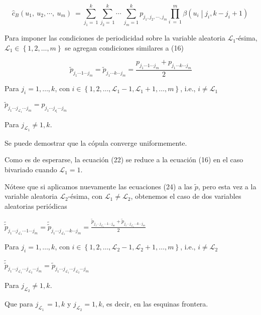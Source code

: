 $${\hat{c}}_{B}\left( u_{1},\ u_{2},\cdots,\ u_{m} \right)\  = \sum_{j_{1} = \ 1}^{k}{\sum_{j_{2} = \ 1}^{k}\cdots\ \sum_{j_{m} = 1}^{k}p_{j_{1},j_{2},\cdots,j_{m}}\prod_{i\  = \ 1}^{m}{\beta\left( u_{i} \middle| j_{i},k - j_{i} + 1 \right)\ }}$$

Para imponer las condiciones de periodicidad sobre la variable aleatoria \(\mathcal{L}_{1}\)-\'esima, \(\mathcal{L}_{1} \in \left\{ 1,2,\ldots,m \right\}\) se agregan condiciones similares a (16)

$${\tilde{p}}_{j_{1}\cdots 1\cdots j_{m}} = {\tilde{p}}_{j_{1}\cdots k\cdots j_{m}} = \frac{p_{j_{1}\cdots 1\cdots j_{m}} + p_{j_{1}\cdots k\cdots j_{m}}}{2}$$

Para \(j_{i} = 1,\ldots,k\), con
\(i \in \left\{ 1,2,\ldots,\mathcal{L}_{1} - 1,\mathcal{L}_{1} + 1,\ldots,m \right\}\),
i.e., \(i \neq \mathcal{L}_{1}\)

\({\tilde{p}}_{j_{1}\cdots j_{\mathcal{L}_{1}}\cdots j_{m}} = p_{j_{1}\cdots j_{\mathcal{l}_{1}}\cdots j_{m}}\)

Para \(j_{\mathcal{L}_{1}} \neq 1,k\).

Se puede demostrar que la c\'opula converge uniformemente.

Como es de esperarse, la ecuaci\'on (22) se reduce a la ecuaci\'on (16) en el caso bivariado cuando \(\mathcal{L}_{1} = 1\).

N\'otese que si aplicamos nuevamente las ecuaciones (24) a las \(\tilde{p}\), pero esta vez a la variable aleatoria \(\mathcal{L}_{2}\)-\'esima, con \(\mathcal{L}_{1} \neq \mathcal{L}_{2}\), obtenemos el caso de dos variables aleatorias peri\'odicas

\({\tilde{\tilde{p}}}_{j_{1}\cdots j_{\mathcal{L}_{1}}\cdots 1\cdots j_{m}} = {\tilde{\tilde{p}}}_{j_{1}\cdots j_{\mathcal{L}_{1}}\cdots k\cdots j_{m}} = \frac{{\tilde{p}}_{j_{1}\cdots j_{\mathcal{L}_{1}}\cdots 1\cdots j_{m}} + {\tilde{p}}_{j_{1}\cdots j_{\mathcal{L}_{1}}\cdots k\cdots j_{m}}}{2}\)

Para \(j_{i} = 1,\ldots,k\), con
\(i \in \left\{ 1,2,\ldots,\mathcal{L}_{2} - 1,\mathcal{L}_{2} + 1,\ldots,m \right\}\),
i.e., \(i \neq \mathcal{L}_{2}\)

\({\tilde{\tilde{p}}}_{j_{1}\cdots j_{\mathcal{L}_{1}}\cdots j_{\mathcal{L}_{2}}\cdots j_{m}} = {\tilde{p}}_{j_{1}\cdots j_{\mathcal{L}_{1}}\cdots j_{\mathcal{L}_{2}}\cdots j_{m}}\)

Para \(j_{\mathcal{L}_{2}} \neq 1,k\). 

Que para \(j_{\mathcal{L}_{1\ }} = 1,k\) y \(j_{\mathcal{L}_{2}} = 1,k\), es decir, en las esquinas frontera.

